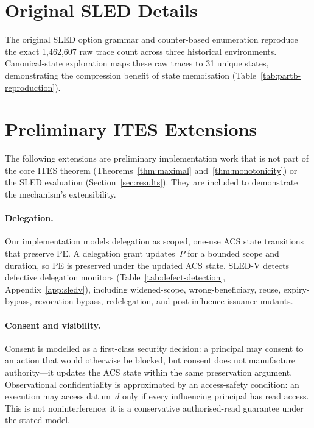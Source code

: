 \documentclass{article}
\begin{document}
\section{Original SLED Details}
\label{app:partb}

The original SLED option grammar and counter-based enumeration reproduce the
exact 1{,}462{,}607 raw trace count across three historical environments.
Canonical-state exploration maps these raw traces to 31 unique states,
demonstrating the compression benefit of state memoisation
(Table~\ref{tab:partb-reproduction}).



\section{Preliminary ITES Extensions}
\label{app:extensions}

The following extensions are preliminary implementation work that is not
part of the core ITES theorem (Theorems~\ref{thm:maximal}
and~\ref{thm:monotonicity}) or the SLED evaluation
(Section~\ref{sec:results}). They are included to demonstrate the
mechanism's extensibility.

\paragraph{Delegation.}
Our implementation models delegation as scoped, one-use ACS state
transitions that preserve PE. A delegation grant updates~$P$ for a bounded
scope and duration, so PE is preserved under the updated ACS state. SLED-V
detects defective delegation monitors
(Table~\ref{tab:defect-detection}, Appendix~\ref{app:sledv}), including
widened-scope, wrong-beneficiary, reuse, expiry-bypass, revocation-bypass,
redelegation, and post-influence-issuance mutants.

\paragraph{Consent and visibility.}
Consent is modelled as a first-class security decision: a principal may
consent to an action that would otherwise be blocked, but consent does not
manufacture authority---it updates the ACS state within the same
preservation argument. Observational confidentiality is approximated by an
access-safety condition: an execution may access datum~$d$ only if every
influencing principal has read access. This is not noninterference; it is a
conservative authorised-read guarantee under the stated model.
\end{document}

